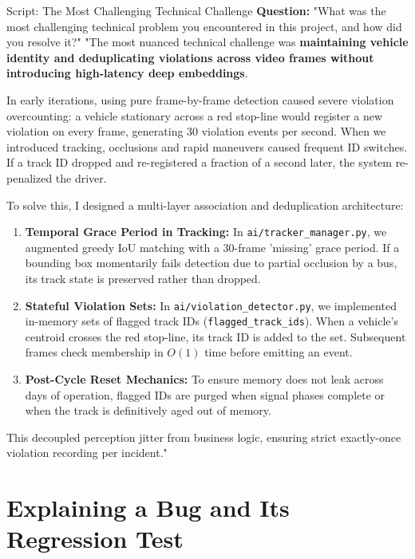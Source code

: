 \documentclass[11pt,a4paper,oneside]{report}
\begin{document}
\begin{interviewq}{Script: The Most Challenging Technical Challenge}
\textbf{Question:} "What was the most challenging technical problem you encountered in this project, and how did you resolve it?"
\tcblower
"The most nuanced technical challenge was \textbf{maintaining vehicle identity and deduplicating violations across video frames without introducing high-latency deep embeddings}.

In early iterations, using pure frame-by-frame detection caused severe violation overcounting: a vehicle stationary across a red stop-line would register a new violation on every frame, generating 30 violation events per second. When we introduced tracking, occlusions and rapid maneuvers caused frequent ID switches. If a track ID dropped and re-registered a fraction of a second later, the system re-penalized the driver.

To solve this, I designed a multi-layer association and deduplication architecture:
\begin{enumerate}
    \item \textbf{Temporal Grace Period in Tracking:} In \texttt{ai/tracker\_manager.py}, we augmented greedy IoU matching with a 30-frame 'missing' grace period. If a bounding box momentarily fails detection due to partial occlusion by a bus, its track state is preserved rather than dropped.
    \item \textbf{Stateful Violation Sets:} In \texttt{ai/violation\_detector.py}, we implemented in-memory sets of flagged track IDs (\texttt{flagged\_track\_ids}). When a vehicle's centroid crosses the red stop-line, its track ID is added to the set. Subsequent frames check membership in $O(1)$ time before emitting an event.
    \item \textbf{Post-Cycle Reset Mechanics:} To ensure memory does not leak across days of operation, flagged IDs are purged when signal phases complete or when the track is definitively aged out of memory.
\end{enumerate}
This decoupled perception jitter from business logic, ensuring strict exactly-once violation recording per incident."
\end{interviewq}

\section{Explaining a Bug and Its Regression Test}
\label{sec:script_bug_regression}
\end{document}

